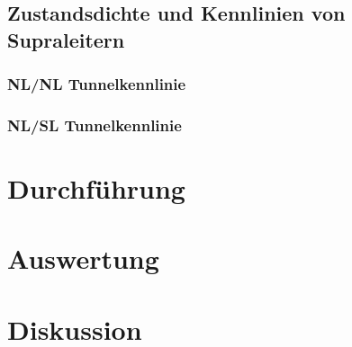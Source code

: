 \documentclass[twoside,        %
               BCOR12mm,       %
               english,ngerman, %
               fleqn,headsepline=false,footsepline=false
              ]{Vorlage/MFPREPORT}
\begin{document}
\subsection{Zustandsdichte und Kennlinien von Supraleitern}
\subsubsection{NL/NL Tunnelkennlinie}
\subsubsection{NL/SL Tunnelkennlinie}
\section{Durchführung}
\label{sec:durchfuehrung}
\section{Auswertung}
\label{sec:auswertung}
\section{Diskussion}

\clearpage

%
%
%
%



\end{document}
